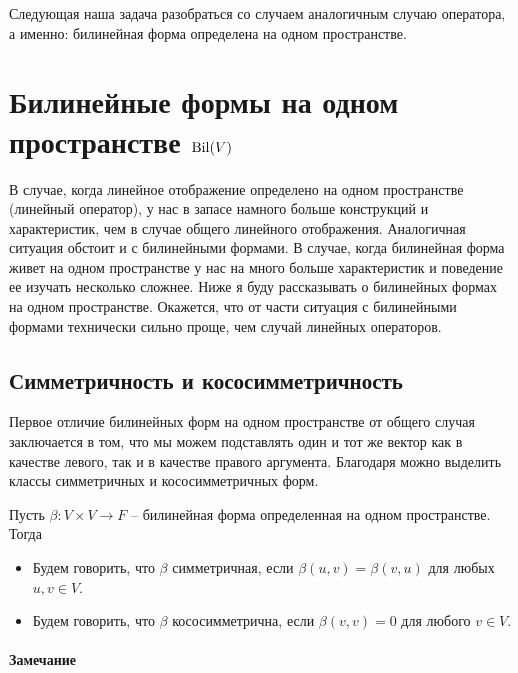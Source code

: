 Следующая наша задача разобраться со случаем аналогичным случаю оператора, а именно: билинейная форма определена на одном пространстве.


\newpage
\section{Билинейные формы на одном пространстве $\operatorname{Bil}(V)$}

В случае, когда линейное отображение определено на одном пространстве (линейный оператор), у нас в запасе намного больше конструкций и характеристик, чем в случае общего линейного отображения.
Аналогичная ситуация обстоит и с билинейными формами.
В случае, когда билинейная форма живет на одном пространстве у нас на много больше характеристик и поведение ее изучать несколько сложнее.
Ниже я буду рассказывать о билинейных формах на одном пространстве.
Окажется, что от части ситуация с билинейными формами технически сильно проще, чем случай линейных операторов.

\subsection{Симметричность и кососимметричность}

Первое отличие билинейных форм на одном пространстве от общего случая заключается в том, что мы можем подставлять один и тот же вектор как в качестве левого, так и в качестве правого аргумента.
Благодаря можно выделить классы симметричных и кососимметричных форм.

\begin{definition}
Пусть $\beta\colon V\times V\to F$ -- билинейная форма определенная на одном пространстве.
Тогда
\begin{itemize}
\item Будем говорить, что $\beta$ симметричная, если $\beta(u,v) = \beta(v,u)$ для любых $u,v\in V$.

\item Будем говорить, что $\beta$ кососимметрична, если $\beta(v,v) = 0$ для любого $v\in V$.
\end{itemize}
\end{definition}

\paragraph{Замечание}

